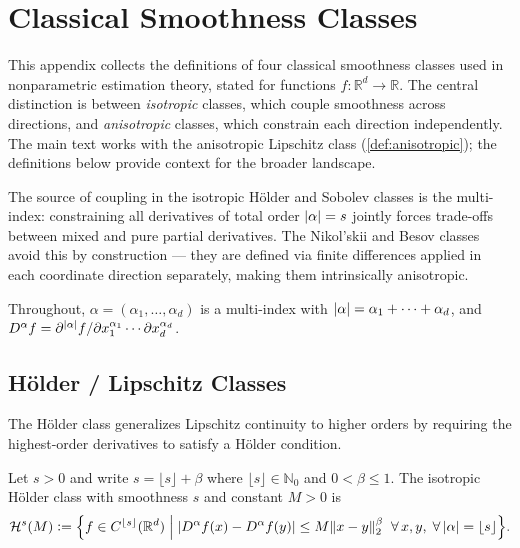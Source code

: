 \section{Classical Smoothness Classes}\label{sec:appendix:smoothness_classes}

This appendix collects the definitions of four classical smoothness classes used in nonparametric estimation theory, stated for functions $f : \mathbb{R}^d \to \mathbb{R}$.
The central distinction is between \emph{isotropic} classes, which couple smoothness across directions, and \emph{anisotropic} classes, which constrain each direction independently.
The main text works with the anisotropic Lipschitz class (\cref{def:anisotropic}); the definitions below provide context for the broader landscape.

The source of coupling in the isotropic Hölder and Sobolev classes is the multi-index: constraining all derivatives of total order $\lvert\alpha\rvert = s$ jointly forces trade-offs between mixed and pure partial derivatives.
The Nikol'skii and Besov classes avoid this by construction --- they are defined via finite differences applied in each coordinate direction separately, making them intrinsically anisotropic.

Throughout, $\alpha = (\alpha_1, \ldots, \alpha_d)$ is a multi-index with $\lvert\alpha\rvert = \alpha_1 + \cdots + \alpha_d$, and $D^\alpha f = \partial^{\lvert\alpha\rvert} f / \partial x_1^{\alpha_1} \cdots \partial x_d^{\alpha_d}$.


\subsection{Hölder / Lipschitz Classes}\label{sec:appendix:holder}

The Hölder class generalizes Lipschitz continuity to higher orders by requiring the highest-order derivatives to satisfy a Hölder condition.

\begin{definition}\label{def:holder_iso}
	Let $s > 0$ and write $s = \lfloor s \rfloor + \beta$ where $\lfloor s \rfloor \in \mathbb{N}_0$ and $0 < \beta \leq 1$.
	The isotropic Hölder class with smoothness $s$ and constant $M > 0$ is
	\begin{equation*}
		\mathcal{H}^s(M) \vcentcolon= \Bigl\{ f \in C^{\lfloor s \rfloor}(\mathbb{R}^d) \;\Big|\; \lvert D^\alpha f(x) - D^\alpha f(y)\rvert \leq M \lVert x - y\rVert_2^\beta \;\;\forall\, x, y,\; \forall\, \lvert\alpha\rvert = \lfloor s \rfloor \Bigr\}.
	\end{equation*}
\end{definition}

